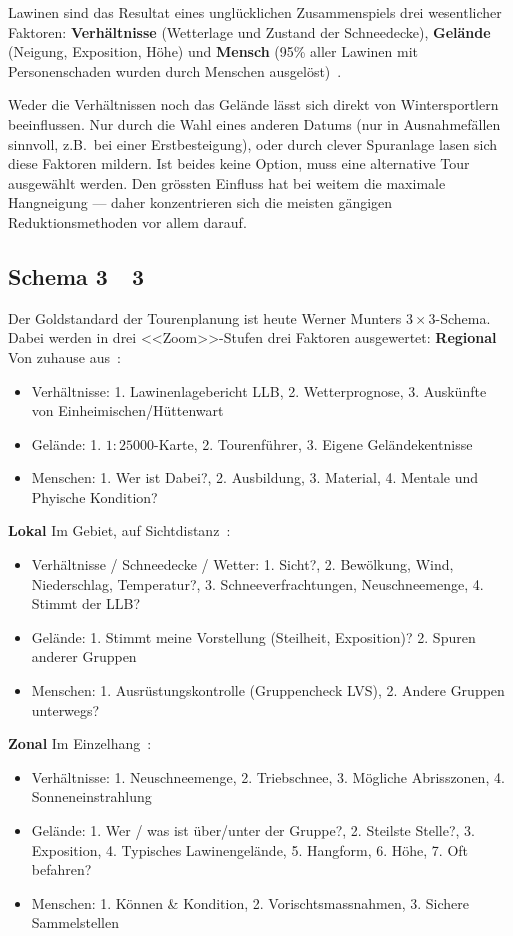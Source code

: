 Lawinen sind das Resultat eines unglücklichen Zusammenspiels drei wesentlicher Faktoren: 
\textbf{Verhältnisse} (Wetterlage und Zustand der Schneedecke), \textbf{Gelände} (Neigung, Exposition, Höhe) und \textbf{Mensch} (95\% aller Lawinen mit Personenschaden wurden durch Menschen ausgelöst)~\cite{ortovoxlabsnow}.

Weder die Verhältnissen noch das Gelände lässt sich direkt von Wintersportlern beeinflussen. Nur durch die Wahl eines anderen Datums (nur in Ausnahmefällen sinnvoll, z.B.\ bei einer Erstbesteigung), oder durch clever Spuranlage lasen sich diese Faktoren mildern. 
Ist beides keine Option, muss eine alternative Tour ausgewählt werden.
Den grössten Einfluss hat bei weitem die maximale Hangneigung --- daher konzentrieren sich die meisten gängigen Reduktionsmethoden vor allem darauf.

\subsection{Schema 3~\texttimes~3}
Der Goldstandard der Tourenplanung ist heute Werner Munters $3\times3$-Schema. Dabei werden in drei <<Zoom>>-Stufen drei Faktoren ausgewertet:
\textbf{Regional} 
Von zuhause aus~\cite{munter}:
\begin{itemize}
  \item Verhältnisse: 1. Lawinenlagebericht LLB, 2. Wetterprognose, 3. Auskünfte von Einheimischen/Hüttenwart
  \item Gelände: 1. $1:25000$-Karte, 2. Tourenführer, 3. Eigene Geländekentnisse
  \item Menschen: 1. Wer ist Dabei?, 2. Ausbildung, 3. Material, 4. Mentale und Phyische Kondition? 
\end{itemize}

\textbf{Lokal} Im Gebiet, auf Sichtdistanz~\cite{munter}\cite{redbull3x3}:
\begin{itemize}
  \item Verhältnisse / Schneedecke / Wetter: 1. Sicht?, 2. Bewölkung, Wind, Niederschlag, Temperatur?, 3. Schneeverfrachtungen, Neuschneemenge, 4. Stimmt der LLB?\
  \item Gelände: 1. Stimmt meine Vorstellung (Steilheit, Exposition)? 2. Spuren anderer Gruppen
  \item Menschen: 1. Ausrüstungskontrolle (Gruppencheck LVS), 2. Andere Gruppen unterwegs?
\end{itemize}
\textbf{Zonal} Im Einzelhang~\cite{munter}\cite{redbull3x3}:
\begin{itemize}
  \item Verhältnisse: 1. Neuschneemenge, 2. Triebschnee, 3. Mögliche Abrisszonen, 4. Sonneneinstrahlung
  \item Gelände: 1. Wer / was ist über/unter der Gruppe?, 2. Steilste Stelle?, 3. Exposition, 4. Typisches Lawinengelände, 5. Hangform, 6. Höhe, 7. Oft befahren?
  \item Menschen: 1. Können \& Kondition, 2. Vorischtsmassnahmen, 3. Sichere Sammelstellen
\end{itemize}

